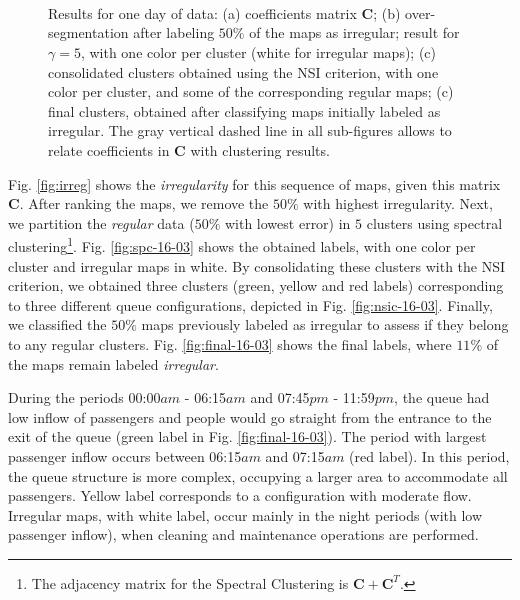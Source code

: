 \begin{figure}[ht]
\centering
{}\\
\\
\\
\hspace{-0.5mm}
\caption{Results for one day of data: (a) coefficients matrix $\mathbf{C}$; (b) over-segmentation after labeling $50\%$ of the maps as irregular; result for $\gamma=5$, with one color per cluster (white for irregular maps); (c) consolidated clusters obtained using the NSI criterion, with one color per cluster, and some of the corresponding regular maps; (c) final clusters, obtained after classifying maps initially labeled as irregular. The gray vertical dashed line in all sub-figures allows to relate coefficients in $\mathbf{C}$ with clustering results.}
\label{fig:16-03}
\end{figure}
%
Fig. \ref{fig:irreg} shows the \emph{irregularity} for this sequence of maps, given this matrix $\mathbf{C}$.
After ranking the maps, we remove the $50\%$ with highest irregularity.
Next, we partition the \emph{regular} data ($50\%$ with lowest error) in $5$ clusters using spectral clustering\footnote{The adjacency matrix for the Spectral Clustering is $\mathbf{C}+\mathbf{C}^T$.}. 
Fig. \ref{fig:spc-16-03} shows the obtained labels, with one color per cluster and irregular maps in white.
%
By consolidating these clusters with the NSI criterion, we obtained three clusters (green, yellow and red labels) corresponding to three different queue configurations, depicted in Fig. \ref{fig:nsic-16-03}.
Finally, we classified the $50\%$ maps previously labeled as irregular to assess if they belong to any regular clusters.
Fig. \ref{fig:final-16-03} shows the final labels, where $11\%$ of the maps remain labeled \emph{irregular}.

During the periods 00:00$am$ - 06:15$am$ and 07:45$pm$ - 11:59$pm$, the queue had low inflow of passengers and people would go straight from the entrance to the exit of the queue (green label in Fig.\! \ref{fig:final-16-03}). 
The period with largest passenger inflow occurs between 06:15$am$ and 07:15$am$ (red label). In this period, the queue structure is more complex, occupying a larger area to accommodate all passengers. 
Yellow label corresponds to a configuration with moderate flow.
Irregular maps, with white label, occur mainly in the night periods (with low passenger inflow), when cleaning and maintenance operations are performed.

